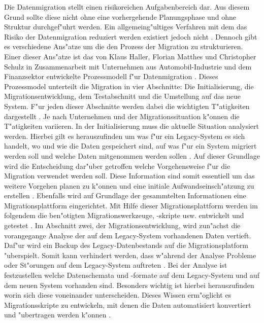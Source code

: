 Die Datenmigration stellt einen risikoreichen Aufgabenbereich dar. Aus diesem Grund sollte diese nicht ohne eine vorhergehende Planungsphase und ohne Struktur durchgef"uhrt werden. Ein allgemeing"ultiges Verfahren mit dem das Risiko der Datenmigration reduziert werden existiert jedoch nicht \citep[S.~3]{wuLawless-1997}. Dennoch gibt es verschiedene Ans"atze um die den Prozess der Migration zu strukturieren. Einer dieser Ans"atze ist das von Klaus Haller, Florian Matthes und Christopher Schulz in Zusammenarbeit mit Unternehmen aus Automobil-Industrie und dem Finanzsektor entwickelte Prozessmodell f"ur Datenmigration \citep[S.~2f.]{klausMatthesSchulz-2012}. 
\lb
Dieses Prozessmodel unterteilt die Migration in vier Abschnitte: Die Initialisierung, die Migrationsentwicklung, dem Testabschnitt und die Umstellung auf das neue System. F"ur jeden dieser Abschnitte werden dabei die wichtigten T"atigkeiten dargestellt \citep[S.~5f]{klausMatthesSchulz-2012}. Je nach Unternehmen und der Migrationssituation k"onnen die T"atigkeiten variieren.
\lb
In der Initialisierung muss die aktuelle Situation analysiert werden. Hierbei gilt es herauszufinden um was f"ur ein Legacy-System es sich handelt, wo und wie die Daten gespeichert sind, auf was f"ur ein System migriert werden soll und welche Daten mitgenommen werden sollen \citep[S.~7]{klausMatthesSchulz-2012}. Auf dieser Grundlage wird die Entscheidung dar"uber getroffen welche Vorgehensweise f"ur die Migration verwendet werden soll. Diese Information sind somit essentiell um das weitere Vorgehen planen zu k"onnen und eine initiale Aufwandseinsch"atzung zu erstellen \citep[S.~7]{klausMatthesSchulz-2012}. Ebenfalls wird auf Grundlage der gesammtelten Informationen eine Migrationsplattform eingerichtet. Mit Hilfe dieser Migrationsplattform werden im folgendem die ben"otigten Migrationswerkzeuge, -skripte usw. entwickelt und getestet \citep[S.~7]{klausMatthesSchulz-2012}.
\lb
Im Abschnitt zwei, der Migrationsentwicklung, wird zun"achst die vorangegange Analyse der auf dem Legacy-System vorhandenen Daten vertieft. Daf"ur wird ein Backup des Legacy-Datenbestands auf die Migrationsplatform "uberspielt. Somit kann verhindert werden, dass w"ahrend der Analyse Probleme oder St"orungen auf dem Legacy-System auftreten \citep[S.~7]{klausMatthesSchulz-2012}. Bei der Analyse ist festzustellen welche Datenschemata und -formate auf dem Legacy-System und auf dem neuen System vorhanden sind. Besonders wichtig ist hierbei herauszufinden worin sich diese voneinander unterscheiden. Dieses Wissen erm"oglicht es Migrationsskripte zu entwickeln, mit denen die Daten automatisiert konvertiert und "ubertragen werden k"onnen \citep[S.~7f.]{klausMatthesSchulz-2012}. 
